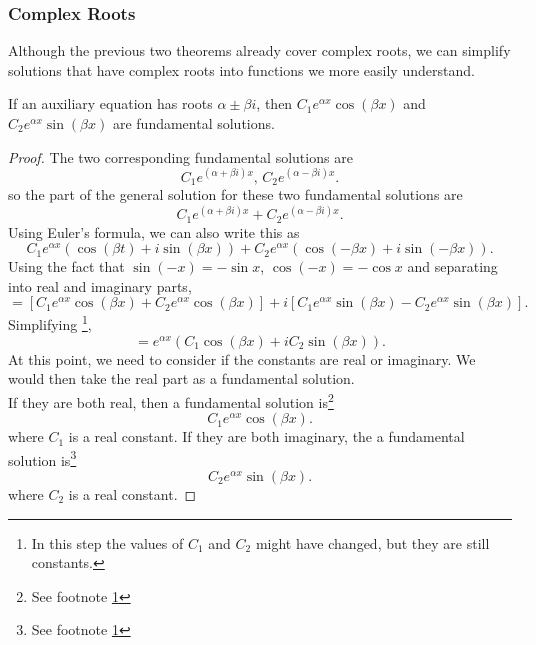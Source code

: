 \subsubsection{Complex Roots}
\noindent
Although the previous two theorems already cover complex roots, we can simplify solutions that have complex roots into functions we more easily understand.\\

\begin{theorem}
	If an auxiliary equation has roots $\alpha \pm \beta i$, then $C_1e^{\alpha x}\cos{(\beta x)}$ and  $C_2e^{\alpha x}\sin{(\beta x)}$ are fundamental solutions.
\end{theorem}
\begin{proof}
	The two corresponding fundamental solutions are
	\begin{equation*}
		C_1e^{(\alpha + \beta i)x} \text{, } C_2e^{(\alpha - \beta i)x}.
	\end{equation*}
	so the part of the general solution for these two fundamental solutions are
	\begin{equation*}
		C_1e^{(\alpha + \beta i)x} + C_2e^{(\alpha - \beta i)x}.
	\end{equation*}
	Using Euler's formula, we can also write this as
	\begin{equation*}
		C_1 e^{\alpha x}\left( \cos{(\beta t)} + i\sin{(\beta x)} \right) + C_2e^{\alpha x}\left( \cos{(-\beta x)} + i\sin{(-\beta x)} \right).
	\end{equation*}
	Using the fact that $\sin{(-x)} = -\sin{x}$, $\cos{(-x)} = -\cos{x}$ and separating into real and imaginary parts,
	\begin{equation*}
		 = \left[ C_1e^{\alpha x}\cos{(\beta x)} + C_2e^{\alpha x}\cos{(\beta x)} \right] + i\left[ C_1e^{\alpha x}\sin{(\beta x)} - C_2e^{\alpha x}\sin{(\beta x)} \right].
	\end{equation*}
	Simplifying \footnote{\label{note1}In this step the values of $C_1$ and $C_2$ might have changed, but they are still constants.},
	\begin{equation*}
		= e^{\alpha x}\left(C_1\cos{(\beta x)} + iC_2\sin{(\beta x)}\right).
	\end{equation*}
	At this point, we need to consider if the constants are real or imaginary.
	We would then take the real part as a fundamental solution.\\
	If they are both real, then a fundamental solution is\footnote{See footnote \ref{note1}}
	\begin{equation*}
		C_1e^{\alpha x}\cos{(\beta x)}.
	\end{equation*}
	where $C_1$ is a real constant.
	If they are both imaginary, the a fundamental solution is\footnote{See footnote \ref{note1}}
	\begin{equation*}
		C_2e^{\alpha x}\sin{(\beta x)}.
	\end{equation*}
	where $C_2$ is a real constant.
\end{proof}

